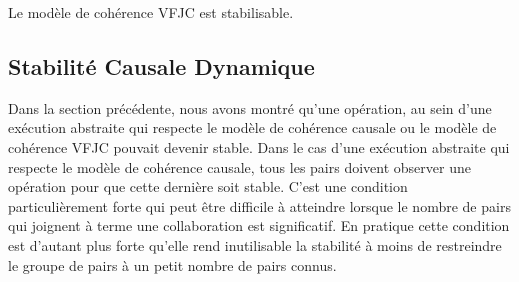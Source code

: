 


\begin{theorem}\label{th:stabilizable-vfjc}
Le modèle de cohérence \ac{VFJC} est stabilisable.
\end{theorem}

\subsection{Stabilité Causale Dynamique}\label{subsec:dcs}

Dans la section précédente, nous avons montré qu'une opération, au sein d'une exécution abstraite qui respecte le modèle de cohérence causale ou le modèle de cohérence \ac{VFJC} pouvait devenir stable.
Dans le cas d'une exécution abstraite qui respecte le modèle de cohérence causale, tous les pairs doivent observer une opération pour que cette dernière soit stable.
C'est une condition particulièrement forte qui peut être difficile à atteindre lorsque le nombre de pairs qui joignent à terme une collaboration est significatif.
En pratique cette condition est d'autant plus forte qu'elle rend inutilisable la stabilité à moins de restreindre le groupe de pairs à un petit nombre de pairs connus.

